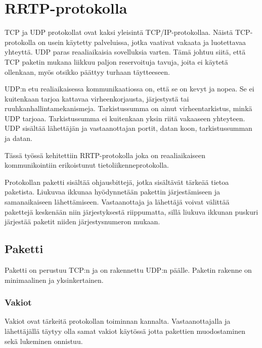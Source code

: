 \documentclass[a4paper,12pt]{article}
\begin{document}
   \section{RRTP-protokolla}\label{sec:protocol}
    TCP ja UDP protokollat ovat kaksi yleisintä TCP/IP-protokollaa.
    Näistä TCP-protokolla on usein käytetty palveluissa, jotka vaativat vakaata ja luotettavaa yhteyttä. UDP paras reaaliaikaisia sovelluksia varten. Tämä johtuu siitä, että TCP paketin mukana liikkuu paljon reservoituja tavuja, joita ei käytetä ollenkaan, myös otsikko päättyy turhaan täytteeseen.
    \par
    UDP:n etu realiaikaisessa kommunikaatiossa on, että se on kevyt ja nopea. Se ei kuitenkaan tarjoa kattavaa virheenkorjausta, järjestystä tai ruuhkanhallintamekanismeja. Tarkistussumma on ainut virheentarkistus, minkä UDP tarjoaa. Tarkistussumma ei kuitenkaan yksin riitä vakaaseen yhteyteen. UDP sisältää
    lähettäjän ja vastaanottajan portit, datan koon, tarkistussumman ja datan.
    \cite{KumarSurveyUDP}
    \par
   
    Tässä työssä kehitettiin RRTP-protokolla joka on reaaliaikaiseen kommunikointiin erikoistunut tietoliikenneprotokolla.\par

    Protokollan paketti sisältää ohjausbittejä, jotka sisältävät tärkeää tietoa paketista.
    Liukuvaa ikkunaa hyödynnetään pakettin järjestämiseen ja samanaikaiseen lähettämiseen.
    Vastaanottaja ja lähettäjä voivat välittää pakettejä keskenään niin järjestyksestä riippumatta, sillä liukuva ikkunan puskuri järjestää paketit niiden järjestysnumeron mukaan.
    
    
   

    \subsection{Paketti}\label{sec:paketti}
    Paketti on perustuu TCP:n ja on rakennettu UDP:n päälle. Paketin rakenne on minimaalinen ja yksinkertainen.

    \subsubsection{Vakiot}
    Vakiot ovat tärkeitä protokollan toiminnan kannalta. Vastaanottajalla ja lähettäjällä täytyy olla samat vakiot käytössä jotta pakettien muodostaminen sekä lukeminen onnistuu.
\end{document}
